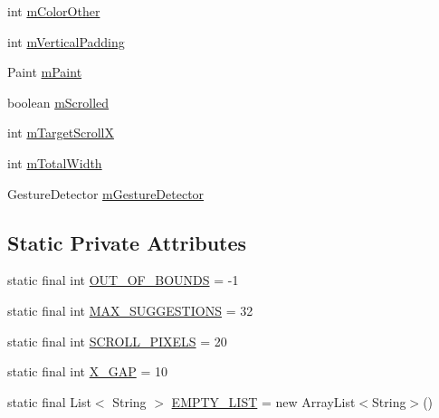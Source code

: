 \begin{DoxyCompactItemize}
\item 
int \hyperlink{classch_1_1zhaw_1_1ba10__bsha__1_1_1ime_1_1CandidateView_aceb46ae8e260d54fc447132586fe690d}{mColorOther}
\item 
int \hyperlink{classch_1_1zhaw_1_1ba10__bsha__1_1_1ime_1_1CandidateView_a09be680d6c44ef69940000d2f784d6c1}{mVerticalPadding}
\item 
Paint \hyperlink{classch_1_1zhaw_1_1ba10__bsha__1_1_1ime_1_1CandidateView_a7dec4379f982d454cb80cf4f1e1c664e}{mPaint}
\item 
boolean \hyperlink{classch_1_1zhaw_1_1ba10__bsha__1_1_1ime_1_1CandidateView_ad2ee9a4886f59f2a631043d59aeb732e}{mScrolled}
\item 
int \hyperlink{classch_1_1zhaw_1_1ba10__bsha__1_1_1ime_1_1CandidateView_a9ed80c188a223426cd2d8577f599ae35}{mTargetScrollX}
\item 
int \hyperlink{classch_1_1zhaw_1_1ba10__bsha__1_1_1ime_1_1CandidateView_aba0e07a01b1f5624c5acba0b22733d39}{mTotalWidth}
\item 
GestureDetector \hyperlink{classch_1_1zhaw_1_1ba10__bsha__1_1_1ime_1_1CandidateView_a4baceb8886b2f5203241dcfd69663344}{mGestureDetector}
\end{DoxyCompactItemize}
\subsection*{Static Private Attributes}
\begin{DoxyCompactItemize}
\item 
static final int \hyperlink{classch_1_1zhaw_1_1ba10__bsha__1_1_1ime_1_1CandidateView_a9315efa15e2f117b2253fc55d3d1912d}{OUT\_\-OF\_\-BOUNDS} = -\/1
\item 
static final int \hyperlink{classch_1_1zhaw_1_1ba10__bsha__1_1_1ime_1_1CandidateView_a1eebcf5c70a711c20ae8b828c7177fe4}{MAX\_\-SUGGESTIONS} = 32
\item 
static final int \hyperlink{classch_1_1zhaw_1_1ba10__bsha__1_1_1ime_1_1CandidateView_ad0dedbdc2b99fa4d34b4cdd4bfe28a23}{SCROLL\_\-PIXELS} = 20
\item 
static final int \hyperlink{classch_1_1zhaw_1_1ba10__bsha__1_1_1ime_1_1CandidateView_a52d99a2607cfa3d1a19b1be6ba8b10d5}{X\_\-GAP} = 10
\item 
static final List$<$ String $>$ \hyperlink{classch_1_1zhaw_1_1ba10__bsha__1_1_1ime_1_1CandidateView_aaf4f6e66871f835ad0f96ebe37a03cb3}{EMPTY\_\-LIST} = new ArrayList$<$String$>$()
\end{DoxyCompactItemize}


